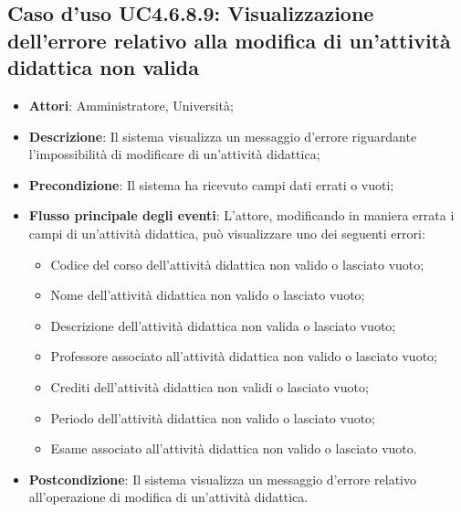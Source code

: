 \subsection{Caso d'uso \texorpdfstring{UC4.6.8.9}{UC4.6.8.9}: Visualizzazione dell'errore relativo alla modifica di un’attività didattica non valida}
\begin{itemize}
\item \textbf{Attori}: Amministratore, Università;
\item \textbf{Descrizione}: Il sistema visualizza un messaggio d'errore riguardante l'impossibilità di modificare di un'attività didattica;

\item \textbf{Precondizione}: Il sistema ha ricevuto campi dati errati o vuoti;

\item \textbf{Flusso principale degli eventi}: L'attore, modificando in maniera errata i campi di un'attività didattica, può visualizzare uno dei seguenti errori: 
\begin{itemize} 
\item Codice del corso dell’attività didattica non valido o lasciato vuoto; 
\item Nome dell’attività didattica non valido o lasciato vuoto;
\item Descrizione dell’attività didattica non valida o lasciato vuoto; 
\item Professore associato all’attività didattica non valido o lasciato vuoto;
\item Crediti dell’attività didattica non validi o lasciato vuoto; 
\item Periodo dell’attività didattica non valido o lasciato vuoto; 
\item Esame associato all’attività didattica non valido o lasciato vuoto. 
\end{itemize}
\item \textbf{Postcondizione}: Il sistema visualizza un messaggio d'errore relativo all'operazione di modifica di un'attività didattica.


\end{itemize}
